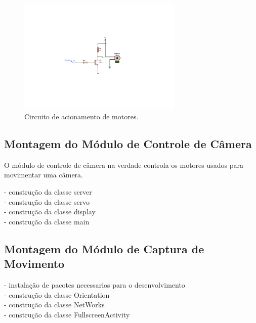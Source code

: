 \begin{figure}[H]
	\centering
	\includegraphics[trim={6.5cm 5cm 7.5cm 4cm},clip,width=0.7\textwidth]{figuras/circ_acionamento.pdf}
	\caption{Circuito de acionamento de motores.}
	\label{fig:circprotecao}
\end{figure}

\subsection{Montagem do Módulo de Controle de Câmera}
\label{subsec:assemmodconcam}

O módulo de controle de câmera na verdade controla os motores usados para movimentar uma câmera. 

- construção da classe server\\
- construção da classe servo\\
- construção da classe display\\
- construção da classe main\\

\subsection{Montagem do Módulo de Captura de Movimento}
\label{subsec:assemmodcapmov}

- instalação de pacotes necessarios para o desenvolvimento\\
- construção da classe Orientation\\
- construção da classe NetWorks\\
- construção da classe FullscreenActivity\\
